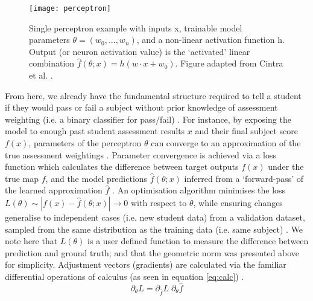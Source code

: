 \begin{figure}[H]
	\begin{center}
		\texttt{[image: perceptron]}
		\caption{Single perceptron example with inputs x, trainable model parameters $\theta = (w_{0}, ...,w_{n} )$, and a non-linear activation function h. Output (or neuron activation value) is the `activated' linear combination $\hat{f}(\theta; x) = h(w \cdot x + w_{0})$. Figure adapted from Cintra et al. \cite{cintra2018}.}
		\label{fig:percept}
	\end{center}
\end{figure}

From here, we already have the fundamental structure required to tell a student if they would pass or fail a subject without prior knowledge of assessment weighting
(i.e. a binary classifier for pass/fail) \cite{rosenblatt1957}. For instance, by exposing the model to enough past student assessment results $x$ and their final subject score $f(x)$, parameters of the perceptron $\theta$ can converge to an approximation of the true assessment weightings \cite{Lundervold2019}. Parameter convergence is achieved via a loss function which calculates the difference between target outputs $f(x)$ under the true map $f$, and the model predictions $\hat{f}(\theta; x)$ inferred from a `forward-pass' of the learned approximation $\hat{f}$ \cite{Bertels2019}. An optimisation algorithm minimises the loss $L(\theta) \sim |f(x)-\hat{f}(\theta; x)| \to 0$ with respect to $\theta$, while ensuring changes generalise to independent cases (i.e. new student data) from a validation dataset, sampled from the same distribution as the training data (i.e. same subject) \cite{Maier2019}. We note here that $L(\theta)$ is a user defined function to measure the difference between prediction and ground truth; and that the geometric norm was presented above for simplicity. Adjustment vectors (gradients) are calculated via the familiar differential operations of calculus (as seen in equation \ref{eq:calc}) \cite{Maier2019}.
\begin{equation}
\partial_{\theta} L = \partial_{\hat{f}}  L \; \partial_{\theta} \hat{f}
\label{eq:calc}
\end{equation}


